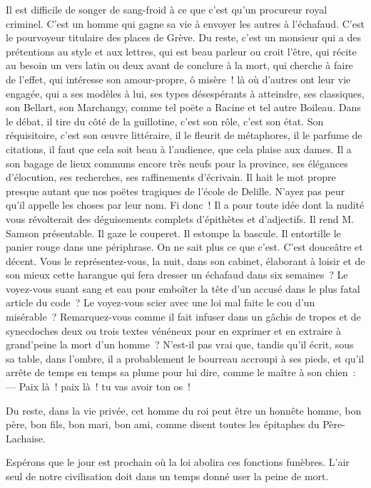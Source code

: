 \documentclass[french,twoside]{book} %
\begin{document}
Il est difficile de songer de sang-froid à ce que c’est qu’un procureur royal criminel. C’est un homme qui gagne sa vie à envoyer les autres à l’échafaud. C’est le pourvoyeur titulaire des places de Grève. Du reste, c’est un monsieur qui a des prétentions au style et aux lettres, qui est beau parleur ou croit l’être, qui récite au besoin un vers latin ou deux avant de conclure à la mort, qui cherche à faire de l’effet, qui intéresse son amour-propre, ô misère ! là où d’autres ont leur vie engagée, qui a ses modèles à lui, ses types désespérants à atteindre, ses classiques, son Bellart, son Marchangy, comme tel poëte a Racine et tel autre Boileau. Dans le débat, il tire du côté de la guillotine, c’est son rôle, c’est son état. Son réquisitoire, c’est son œuvre littéraire, il le fleurit de métaphores, il le parfume de citations, il faut que cela soit beau à l’audience, que cela plaise aux dames. Il a son bagage de lieux communs encore très neufs pour la province, ses élégances d’élocution, ses recherches, ses raffinements d’écrivain. Il hait le mot propre presque autant que nos poëtes tragiques de l’école de Delille. N’ayez pas peur qu’il appelle les choses par leur nom. Fi donc ! Il a pour toute idée dont la nudité vous révolterait des déguisements complets d’épithètes et d’adjectifs. Il rend M. Samson présentable. Il gaze le couperet. Il estompe la bascule. Il entortille le panier rouge dans une périphrase. On ne sait plus ce que c’est. C’est douceâtre et décent. Vous le représentez-vous, la nuit, dans son cabinet, élaborant à loisir et de son mieux cette harangue qui fera dresser un échafaud dans six semaines ? Le voyez-vous  suant sang et eau pour emboîter la tête d’un accusé dans le plus fatal article du code ? Le voyez-vous scier avec une loi mal faite le cou d’un misérable ? Remarquez-vous comme il fait infuser dans un gâchis de tropes et de synecdoches deux ou trois textes vénéneux pour en exprimer et en extraire à grand’peine la mort d’un homme ? N’est-il pas vrai que, tandis qu’il écrit, sous sa table, dans l’ombre, il a probablement le bourreau accroupi à ses pieds, et qu’il arrête de temps en temps sa plume pour lui dire, comme le maître à son chien : — Paix là ! paix là ! tu vas avoir ton os !\par
Du reste, dans la vie privée, cet homme du roi peut être un honnête homme, bon père, bon fils, bon mari, bon ami, comme disent toutes les épitaphes du Père-Lachaise.\par
Espérons que le jour est prochain où la loi abolira ces fonctions funèbres. L’air seul de notre civilisation doit dans un temps donné user la peine de mort.\par
\end{document}
